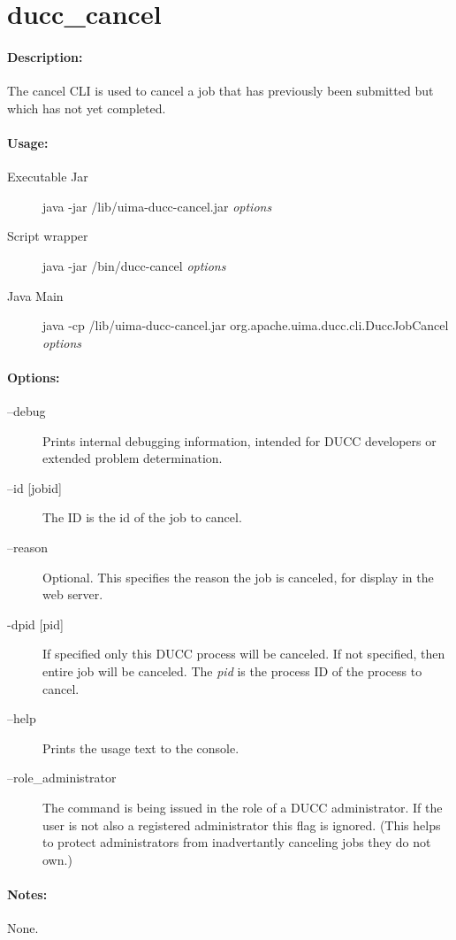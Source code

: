     \section{ducc\_cancel}

    \paragraph{Description:}
    The cancel CLI is used to cancel a job that has previously been submitted but which has not yet 
    completed. 

    \paragraph{Usage:}
    \begin{description}
    \item[Executable Jar] java -jar \ducchome/lib/uima-ducc-cancel.jar {\em options}
    \item[Script wrapper] java -jar \ducchome/bin/ducc-cancel {\em options}
    \item[Java Main]      java -cp \ducchome/lib/uima-ducc-cancel.jar org.apache.uima.ducc.cli.DuccJobCancel {\em options}
    \end{description}

    \paragraph{Options:}
    \begin{description}
        \item[--debug ]          
          Prints internal debugging information, intended for DUCC developers or extended problem determination.                    
        \item[--id {[jobid]}]
          The ID is the id of the job to cancel.
        \item[--reason]
          Optional. This specifies the reason the job is canceled, for display in the web server.
        \item[-dpid {[pid]}]
          If specified only this DUCC process will be canceled.  If not
          specified, then entire job will be canceled.  The {\em pid} is the process ID of the
          process to cancel.
        \item[--help]
          Prints the usage text to the console. 
        \item[--role\_administrator] The command is being issued in the role of a DUCC administrator.
          If the user is not also a registered administrator this flag is ignored.  (This helps to
          protect administrators from inadvertantly canceling jobs they do not own.)
     \end{description}
        
    \paragraph{Notes:}
    None.

